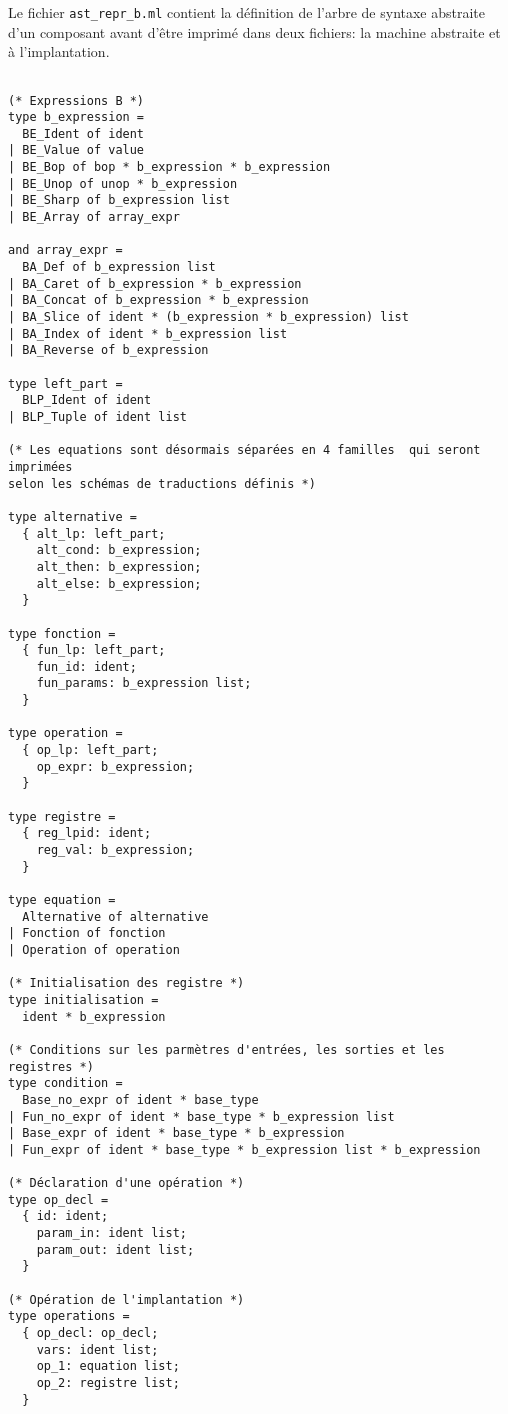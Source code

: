 \noindent
Le fichier \texttt{ast\_repr\_b.ml} contient la définition de l'arbre de
syntaxe abstraite d'un composant avant d'être imprimé dans deux fichiers: 
la machine abstraite et à l'implantation.
\begin{small}
\begin{verbatim} 

(* Expressions B *)
type b_expression =
  BE_Ident of ident
| BE_Value of value
| BE_Bop of bop * b_expression * b_expression
| BE_Unop of unop * b_expression
| BE_Sharp of b_expression list
| BE_Array of array_expr

and array_expr =
  BA_Def of b_expression list
| BA_Caret of b_expression * b_expression
| BA_Concat of b_expression * b_expression
| BA_Slice of ident * (b_expression * b_expression) list
| BA_Index of ident * b_expression list
| BA_Reverse of b_expression

type left_part =
  BLP_Ident of ident 
| BLP_Tuple of ident list

(* Les equations sont désormais séparées en 4 familles  qui seront imprimées
selon les schémas de traductions définis *)

type alternative =
  { alt_lp: left_part;
    alt_cond: b_expression;
    alt_then: b_expression;
    alt_else: b_expression;
  }

type fonction =
  { fun_lp: left_part;
    fun_id: ident;
    fun_params: b_expression list;
  }

type operation =
  { op_lp: left_part;
    op_expr: b_expression;
  }

type registre =
  { reg_lpid: ident;
    reg_val: b_expression;
  }

type equation =
  Alternative of alternative
| Fonction of fonction
| Operation of operation

(* Initialisation des registre *)
type initialisation =
  ident * b_expression

(* Conditions sur les parmètres d'entrées, les sorties et les registres *)
type condition =
  Base_no_expr of ident * base_type
| Fun_no_expr of ident * base_type * b_expression list
| Base_expr of ident * base_type * b_expression
| Fun_expr of ident * base_type * b_expression list * b_expression

(* Déclaration d'une opération *)
type op_decl =
  { id: ident;
    param_in: ident list;
    param_out: ident list;
  }

(* Opération de l'implantation *)
type operations =
  { op_decl: op_decl; 
    vars: ident list;
    op_1: equation list;
    op_2: registre list;
  }


\end{verbatim}
\end{small}
